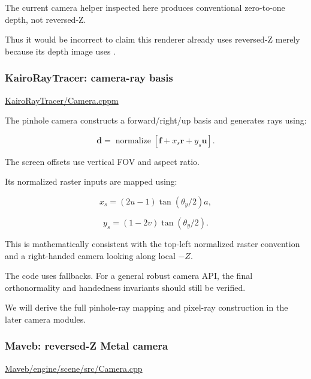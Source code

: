 The current camera helper inspected here produces conventional zero-to-one depth, not reversed-Z.

Thus it would be incorrect to claim this renderer already uses reversed-Z merely because its depth image uses .

\subsubsection{KairoRayTracer: camera-ray basis}\label{02-foundations-ii-ch037-kairoraytracer-camera-ray-basis}

\hypertarget{02-foundations-ii-ch037-kairoraytracer-camera-ray-basis}{}

\href{https://github.com/swayam8624/KairoRayTracer/blob/main/Camera.cppm?utm_source=chatgpt.com}{KairoRayTracer/Camera.cppm}

The pinhole camera constructs a forward/right/up basis and generates rays using:

\[
 \boxed{ \mathbf d= \operatorname{normalize} \left[ \mathbf f+ x_s\mathbf r+ y_s\mathbf u \right] }.
\]

The screen offsets use vertical FOV and aspect ratio.

Its normalized raster inputs are mapped using:

\[
 x_s=(2u-1)\tan(\theta_y/2)a,
\]

\[
 y_s=(1-2v)\tan(\theta_y/2).
\]

This is mathematically consistent with the top-left normalized raster convention and a right-handed camera looking along local \(-Z\).

The code uses  fallbacks. For a general robust camera API, the final orthonormality and handedness invariants should still be verified.

We will derive the full pinhole-ray mapping and pixel-ray construction in the later camera modules.

\subsubsection{Maveb: reversed-Z Metal camera}\label{02-foundations-ii-ch037-maveb-reversed-z-metal-camera}

\hypertarget{02-foundations-ii-ch037-maveb-reversed-z-metal-camera}{}

\href{https://github.com/swayam8624/Maveb/blob/main/engine/scene/src/Camera.cpp?utm_source=chatgpt.com}{Maveb/engine/scene/src/Camera.cpp}

